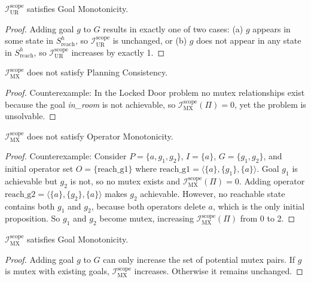 \begin{prop}
    $\mathcal{I}^{\text{scope}}_{\text{UR}}$ satisfies Goal Monotonicity.
\end{prop}
\begin{proof}
    Adding goal $g$ to $G$ results in exactly one of two cases: (a) $g$ appears in some state in $S^h_{\text{reach}}$, so $\mathcal{I}^{\text{scope}}_{\text{UR}}$ is unchanged, or (b) $g$ does not appear in any state in $S^h_{\text{reach}}$, so $\mathcal{I}^{\text{scope}}_{\text{UR}}$ increases by exactly 1.
\end{proof}

\begin{prop}
    $\mathcal{I}^{\text{scope}}_{\text{MX}}$ does not satisfy Planning Consistency.
\end{prop}
\begin{proof}
    Counterexample: In the Locked Door problem no mutex relationships exist because the goal \textit{in\_room} is not achievable, so $\mathcal{I}^{\text{scope}}_{\text{MX}}(\Pi) = 0$, yet the problem is unsolvable.
\end{proof}

\begin{prop}
    $\mathcal{I}^{\text{scope}}_{\text{MX}}$ does not satisfy Operator Monotonicity.
\end{prop}
\begin{proof}
    Counterexample: Consider $P = \{a, g_1, g_2\}$, $I = \{a\}$, $G = \{g_1, g_2\}$, and initial operator set $O = \{\text{reach\_g1}\}$ where $\text{reach\_g1} = \langle \{a\}, \{g_1\}, \{a\} \rangle$. Goal $g_1$ is achievable but $g_2$ is not, so no mutex exists and $\mathcal{I}^{\text{scope}}_{\text{MX}}(\Pi) = 0$. Adding operator $\text{reach\_g2} = \langle \{a\}, \{g_2\}, \{a\} \rangle$ makes $g_2$ achievable. However, no reachable state contains both $g_1$ and $g_2$, because both operators delete $a$, which is the only initial proposition. So $g_1$ and $g_2$ become mutex, increasing $\mathcal{I}^{\text{scope}}_{\text{MX}}(\Pi)$ from 0 to 2.
\end{proof}

\begin{prop}
    $\mathcal{I}^{\text{scope}}_{\text{MX}}$ satisfies Goal Monotonicity.
\end{prop}
\begin{proof}
    Adding goal $g$ to $G$ can only increase the set of potential mutex pairs. If $g$ is mutex with existing goals, $\mathcal{I}^{\text{scope}}_{\text{MX}}$ increases. Otherwise it remains unchanged.
\end{proof}

